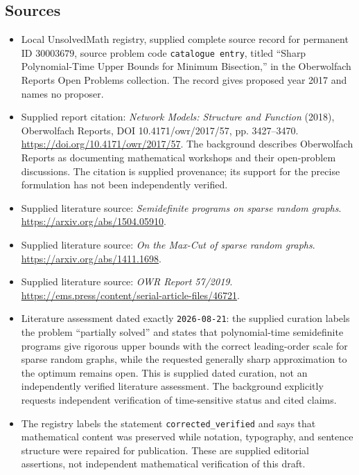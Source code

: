 \documentclass[11pt]{article}
\begin{document}
\subsection{Sources}
\begin{itemize}
\item Local UnsolvedMath registry, supplied complete source record for permanent ID \(30003679\), source problem code \texttt{catalogue entry}, titled ``Sharp Polynomial-Time Upper Bounds for Minimum Bisection,'' in the Oberwolfach Reports Open Problems collection. The record gives proposed year 2017 and names no proposer.
\item Supplied report citation: \emph{Network Models: Structure and Function} (2018), Oberwolfach Reports, DOI 10.4171/owr/2017/57, pp. 3427--3470. \url{https://doi.org/10.4171/owr/2017/57}. The background describes Oberwolfach Reports as documenting mathematical workshops and their open-problem discussions. The citation is supplied provenance; its support for the precise formulation has not been independently verified.
\item Supplied literature source: \emph{Semidefinite programs on sparse random graphs}. \url{https://arxiv.org/abs/1504.05910}.
\item Supplied literature source: \emph{On the Max-Cut of sparse random graphs}. \url{https://arxiv.org/abs/1411.1698}.
\item Supplied literature source: \emph{OWR Report 57/2019}. \url{https://ems.press/content/serial-article-files/46721}.
\item Literature assessment dated exactly \texttt{2026-08-21}: the supplied curation labels the problem ``partially solved'' and states that polynomial-time semidefinite programs give rigorous upper bounds with the correct leading-order scale for sparse random graphs, while the requested generally sharp approximation to the optimum remains open. This is supplied dated curation, not an independently verified literature assessment. The background explicitly requests independent verification of time-sensitive status and cited claims.
\item The registry labels the statement \texttt{corrected\_verified} and says that mathematical content was preserved while notation, typography, and sentence structure were repaired for publication. These are supplied editorial assertions, not independent mathematical verification of this draft.
\end{itemize}
\end{document}
